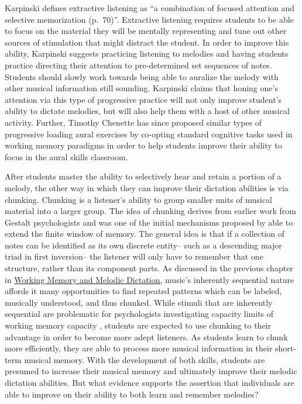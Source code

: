 \documentclass[12pt,]{book}
\begin{document}
Karpinski defines extractive listening as ``a combination of focused attention and selective memorization (p.~70)''.
Extractive listening requires students to be able to focus on the material they will be mentally representing and tune out other sources of stimulation that might distract the student.
In order to improve this ability, Karpinski suggests practicing listening to melodies and having students practice directing their attention to pre-determined set sequences of notes.
Students should slowly work towards being able to auralize the melody with other musical information still sounding.
Karpinski claims that honing one's attention via this type of progressive practice will not only improve student's ability to dictate melodies, but will also help them with a host of other musical activity.
Further, Timothy Chenette has since proposed similar types of progressive loading aural exercises by co-opting standard cognitive tasks used in working memory paradigms \citep{chenetteReframingAuralSkills2019} in order to help students improve their ability to focus in the aural skills classroom.

After students master the ability to selectively hear and retain a portion of a melody, the other way in which they can improve their dictation abilities is via chunking.
Chunking is a listener's ability to group smaller units of musical material into a larger group.
The idea of chunking derives from earlier work from Gestalt psychologists and was one of the initial mechanisms proposed by \citet{millerMagicalNumberSeven1956} able to extend the finite window of memory.
The general idea is that if a collection of notes can be identified as its own discrete entity-- such as a descending major triad in first inversion-- the listener will only have to remember that one structure, rather than its component parts.
As discussed in the previous chapter in \protect\hyperlink{working-memory-and-melodic-dictation}{Working Memory and Melodic Dictation}, music's inherently sequential nature affords it many opportunities to find repeated patterns which can be labeled, musically understood, and thus chunked.
While stimuli that are inherently sequential are problematic for psychologists investigating capacity limits of working memory capacity \citep{cowanWorkingMemoryCapacity2005}, students are expected to use chunking to their advantage in order to become more adept listeners.
As students learn to chunk more efficiently, they are able to process more musical information in their short-term musical memory.
With the development of both skills, students are presumed to increase their musical memory and ultimately improve their melodic dictation abilities.
But what evidence supports the assertion that individuals are able to improve on their ability to both learn and remember melodies?
\end{document}
